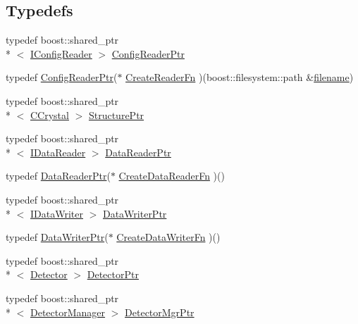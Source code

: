 \subsection*{Typedefs}
\begin{DoxyCompactItemize}
\item 
typedef boost\-::shared\-\_\-ptr\\*
$<$ \hyperlink{class_q_s_t_e_m_1_1_i_config_reader}{I\-Config\-Reader} $>$ \hyperlink{namespace_q_s_t_e_m_af9424707fe9f6503298f49b41304bd35}{Config\-Reader\-Ptr}
\item 
typedef \hyperlink{namespace_q_s_t_e_m_af9424707fe9f6503298f49b41304bd35}{Config\-Reader\-Ptr}($\ast$ \hyperlink{namespace_q_s_t_e_m_afe36827e976fd231943b40ce85533524}{Create\-Reader\-Fn} )(boost\-::filesystem\-::path \&\hyperlink{write_fields2_file_8m_af3723aa817dbb65282d5e1db81f08ad8}{filename})
\item 
typedef boost\-::shared\-\_\-ptr\\*
$<$ \hyperlink{class_q_s_t_e_m_1_1_c_crystal}{C\-Crystal} $>$ \hyperlink{namespace_q_s_t_e_m_a7ab0b6bb11e12c9829540e6d872946fc}{Structure\-Ptr}
\item 
typedef boost\-::shared\-\_\-ptr\\*
$<$ \hyperlink{class_q_s_t_e_m_1_1_i_data_reader}{I\-Data\-Reader} $>$ \hyperlink{namespace_q_s_t_e_m_ae38d8cc1829f3379403b3020c44938da}{Data\-Reader\-Ptr}
\item 
typedef \hyperlink{namespace_q_s_t_e_m_ae38d8cc1829f3379403b3020c44938da}{Data\-Reader\-Ptr}($\ast$ \hyperlink{namespace_q_s_t_e_m_a3e396e1b9e670f80ea3a73126fe429a0}{Create\-Data\-Reader\-Fn} )()
\item 
typedef boost\-::shared\-\_\-ptr\\*
$<$ \hyperlink{class_q_s_t_e_m_1_1_i_data_writer}{I\-Data\-Writer} $>$ \hyperlink{namespace_q_s_t_e_m_a370bd18d36890fd91e04bf74b84bc02a}{Data\-Writer\-Ptr}
\item 
typedef \hyperlink{namespace_q_s_t_e_m_a370bd18d36890fd91e04bf74b84bc02a}{Data\-Writer\-Ptr}($\ast$ \hyperlink{namespace_q_s_t_e_m_aae795ff3e7acb0931b3dc001b547c004}{Create\-Data\-Writer\-Fn} )()
\item 
typedef boost\-::shared\-\_\-ptr\\*
$<$ \hyperlink{class_q_s_t_e_m_1_1_detector}{Detector} $>$ \hyperlink{namespace_q_s_t_e_m_a481d2ce6e8f3dc77e2158d1120a4d6a2}{Detector\-Ptr}
\item 
typedef boost\-::shared\-\_\-ptr\\*
$<$ \hyperlink{class_q_s_t_e_m_1_1_detector_manager}{Detector\-Manager} $>$ \hyperlink{namespace_q_s_t_e_m_a7d63bb9157fbc06047c5408ff2b1ee07}{Detector\-Mgr\-Ptr}

\end{DoxyCompactItemize}
